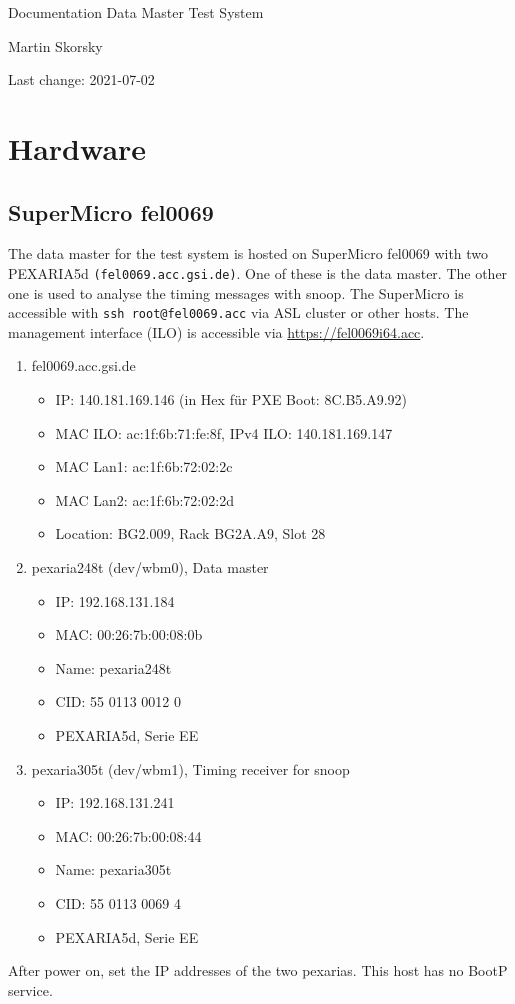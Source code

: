 \documentclass[12pt,a4paper]{report}
\begin{document}
\begin{titlepage}
\vspace{2cm}
\begin{center}
\Huge{Documentation Data Master Test System}

\Large{Martin Skorsky}

\Large{Last change: 2021-07-02}
\end{center}
\vfill
\end{titlepage}

\tableofcontents

\chapter{Hardware}
\section{SuperMicro fel0069}
The data master for the test system is hosted on SuperMicro fel0069 with two PEXARIA5d \texttt{(fel0069.acc.gsi.de)}.
One of these is the data master. The other one is used to analyse the timing messages with snoop.
The SuperMicro is accessible with \texttt{ssh root@fel0069.acc} via ASL cluster or other hosts.
The management interface (ILO) is accessible via \url{https://fel0069i64.acc}.
\begin{enumerate}
\item fel0069.acc.gsi.de
\begin{itemize}
\item IP: 140.181.169.146 (in Hex für PXE Boot: 8C.B5.A9.92)
\item MAC ILO: ac:1f:6b:71:fe:8f, IPv4 ILO: 140.181.169.147
\item MAC Lan1: ac:1f:6b:72:02:2c
\item MAC Lan2: ac:1f:6b:72:02:2d
\item Location: BG2.009, Rack BG2A.A9, Slot 28
\end{itemize}
\item pexaria248t (dev/wbm0), Data master
\begin{itemize}
\item IP: 192.168.131.184
\item MAC: 00:26:7b:00:08:0b
\item Name: pexaria248t
\item CID: 55 0113 0012 0
\item PEXARIA5d, Serie EE
\end{itemize}
\item pexaria305t (dev/wbm1), Timing receiver for snoop
\begin{itemize}
\item IP: 192.168.131.241
\item MAC: 00:26:7b:00:08:44
\item Name: pexaria305t
\item CID: 55 0113 0069 4
\item PEXARIA5d, Serie EE
\end{itemize}
\end{enumerate}
After power on, set the IP addresses of the two pexarias. This host has no BootP service.
\end{document}
